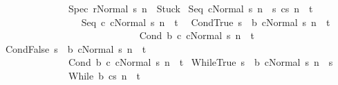 \begin{isabellebody}
\ \ \ \ \ \ \ \ \ \ \ \ \ \ {\isasymGamma}{\isasymturnstile}{\isasymlangle}Spec\ r{\isacharcomma}Normal\ s{\isasymrangle}\ {\isacharequal}n{\isasymRightarrow}\ \ Stuck{\isachardoublequoteclose}\isanewline
\isanewline
{\isacharbar}\ Seq{\isacharcolon}\ {\isachardoublequoteopen}{\isasymlbrakk}{\isasymGamma}{\isasymturnstile}{\isasymlangle}cNormal\ s{\isasymrangle}\ {\isacharequal}n{\isasymRightarrow}\ \ s{\isacharprime}{\isacharsemicolon}\ {\isasymGamma}{\isasymturnstile}{\isasymlangle}cs{\isacharprime}{\isasymrangle}\ {\isacharequal}n{\isasymRightarrow}\ \ t{\isasymrbrakk}\isanewline
\ \ \ \ \ \ \ \ {\isasymLongrightarrow}\isanewline
\ \ \ \ \ \ \ \ {\isasymGamma}{\isasymturnstile}{\isasymlangle}Seq\ c\ cNormal\ s{\isasymrangle}\ {\isacharequal}n{\isasymRightarrow}\ \ t{\isachardoublequoteclose}\ \isanewline
\isanewline
{\isacharbar}\ CondTrue{\isacharcolon}\ {\isachardoublequoteopen}{\isasymlbrakk}s\ {\isasymin}\ b{\isacharsemicolon}\ {\isasymGamma}{\isasymturnstile}{\isasymlangle}cNormal\ s{\isasymrangle}\ {\isacharequal}n{\isasymRightarrow}\ \ t{\isasymrbrakk}\ \isanewline
\ \ \ \ \ \ \ \ \ \ \ \ \ {\isasymLongrightarrow}\ \ \isanewline
\ \ \ \ \ \ \ \ \ \ \ \ \ {\isasymGamma}{\isasymturnstile}{\isasymlangle}Cond\ b\ c\ cNormal\ s{\isasymrangle}\ {\isacharequal}n{\isasymRightarrow}\ \ t{\isachardoublequoteclose}\isanewline
\isanewline
{\isacharbar}\ CondFalse{\isacharcolon}\ {\isachardoublequoteopen}{\isasymlbrakk}s\ {\isasymnotin}\ b{\isacharsemicolon}\ {\isasymGamma}{\isasymturnstile}{\isasymlangle}cNormal\ s{\isasymrangle}\ {\isacharequal}n{\isasymRightarrow}\ \ t{\isasymrbrakk}\ \isanewline
\ \ \ \ \ \ \ \ \ \ \ \ \ \ {\isasymLongrightarrow}\ \ \isanewline
\ \ \ \ \ \ \ \ \ \ \ \ \ \ {\isasymGamma}{\isasymturnstile}{\isasymlangle}Cond\ b\ c\ cNormal\ s{\isasymrangle}\ {\isacharequal}n{\isasymRightarrow}\ \ t{\isachardoublequoteclose}\isanewline
\isanewline
{\isacharbar}\ WhileTrue{\isacharcolon}\ {\isachardoublequoteopen}{\isasymlbrakk}s\ {\isasymin}\ b{\isacharsemicolon}\ {\isasymGamma}{\isasymturnstile}{\isasymlangle}c{\isacharcomma}Normal\ s{\isasymrangle}\ {\isacharequal}n{\isasymRightarrow}\ \ s{\isacharprime}{\isacharsemicolon}\ \isanewline
\ \ \ \ \ \ \ \ \ \ \ \ \ \ {\isasymGamma}{\isasymturnstile}{\isasymlangle}While\ b\ c{\isacharcomma}s{\isacharprime}{\isasymrangle}\ {\isacharequal}n{\isasymRightarrow}\ \ t{\isasymrbrakk}\ \isanewline

\end{isabellebody}
